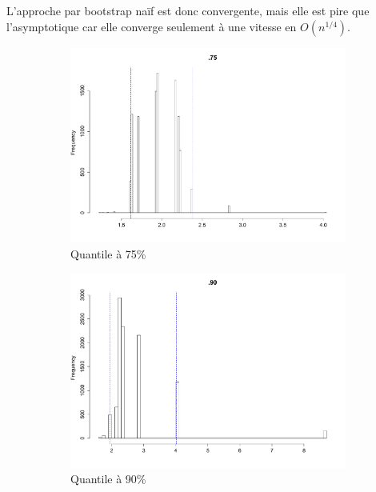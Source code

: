 \documentclass{article}
\renewcommand*{\(}{ \left( }
\renewcommand*{\)}{ \right) }
\begin{document}
L'approche par bootstrap naïf est donc convergente, mais elle est pire que l'asymptotique car elle converge seulement à une vitesse en $O(n^{1/4})$.

\begin{figure}[H]
    \centering
    \begin{subfigure}[t]{0.3\textwidth}
        \includegraphics[width = \linewidth]{img/BootstrapNaif-75-30.pdf}
        \caption{Quantile à 75\%}
        \label{fig:naifB75}
    \end{subfigure}%
    \begin{subfigure}[t]{0.3\textwidth}
        \includegraphics[width = \linewidth]{img/BootstrapNaif-90-30.pdf}
        \caption{Quantile à 90\%}
        \label{naifB90}
    \end{subfigure}%
    \begin{subfigure}[t]{0.3\textwidth}

\end{subfigure}
\end{figure}
\end{document}
